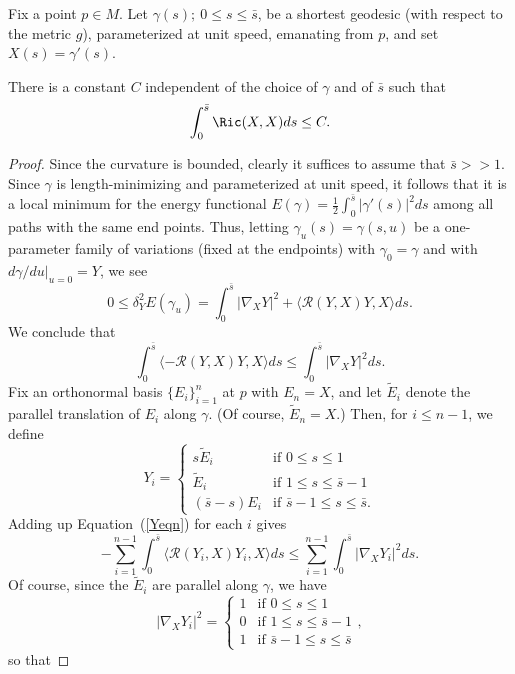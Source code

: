  Fix a point $p\in M$. Let
$\gamma(s);\ 0\le s\le \bar s$, be a shortest geodesic (with respect to the
metric $g$), parameterized at unit speed, emanating from $p$, and set
$X(s)=\gamma'(s)$.

\begin{claim}\label{claim:ricci-integral-bound}
There is a constant $C$ independent of the choice of
$\gamma$ and of $\bar s$ such that
$$\int_0^{\bar s}\Ric(X,X)ds\le C.$$
\end{claim}

\begin{proof}
Since the curvature is bounded, clearly it suffices to assume that
$\bar s>>1$. Since $\gamma$ is length-minimizing and parameterized
at unit speed, it follows that it is a local minimum for the energy
functional $E(\gamma)=\frac{1}{2}\int_0^{\bar s}|\gamma'(s)|^2ds$
among all paths with the same end points. Thus, letting
$\gamma_u(s)=\gamma(s,u)$ be a one-parameter family of variations
(fixed at the endpoints) with $\gamma_0=\gamma$ and with
$d\gamma/du|_{u=0}=Y$, we see
$$0\le \delta_{Y}^2E(\gamma_u)=\int_0^{\bar
s}|\nabla_XY|^2+\langle {\mathcal R}(Y,X)Y,X\rangle ds.$$ We
conclude that
\begin{equation}\label{Yeqn}
\int_0^{\bar s}\langle -{\mathcal R}(Y,X)Y,X\rangle ds\le
\int_0^{\bar s}|\nabla_XY|^2ds.
\end{equation} Fix an orthonormal basis $\{E_i\}_{i=1}^n$  at $p$ with $E_n=X$, and let
$\widetilde E_i$ denote the parallel translation of $E_i$ along $\gamma$. (Of
course, $\widetilde E_n=X$.) Then, for $i\le n-1$, we define
$$Y_i=\left\{\begin{array}{ll} s\widetilde E_i & \mbox{if $0\le s\le
1$} \\ \widetilde E_i & \mbox{if $1\le s\le \bar s-1$} \\
(\bar s-s)E_i & \mbox{if $\bar s-1\le s\le \bar s$.} \end{array}
\right. $$ Adding up Equation~(\ref{Yeqn}) for each $i$ gives
$$-\sum_{i=1}^{n-1}\int_0^{\bar s}\langle{\mathcal R}(Y_i,X)Y_i,X\rangle ds\le
\sum_{i=1}^{n-1}\int_0^{\bar s}|\nabla_XY_i|^2ds.$$ Of course, since the
$\widetilde E_i$ are parallel along $\gamma$, we have
$$|\nabla_XY_i|^2=\left\{\begin{array}{ll} 1 & \mbox{if $0\le s\le 1$}
\\ 0 & \mbox{if $1\le s\le \bar s-1$} \\ 1 & \mbox{if $\bar s-1\le s\le
\bar s$}\end{array}\right. ,$$ so that

\end{proof}
